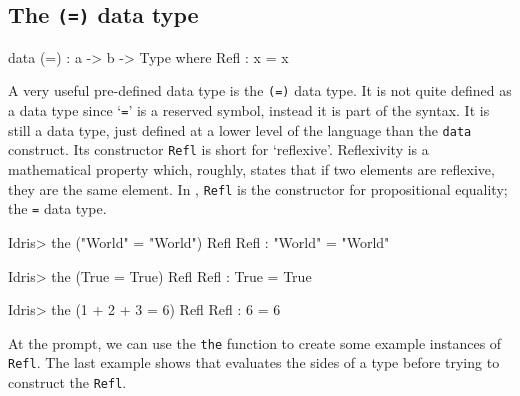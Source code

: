     \subsection{The \texttt{(=)} data type}
        \begin{code}[label={des:refl-concept}, caption={The concept of an equality data type}]
        data (=) : a -> b -> Type where
            Refl : x = x
        \end{code}
    
        A very useful pre-defined data type is the \texttt{(=)} data type. It is not quite defined as a data type since `\texttt{=}' is a reserved symbol, instead it is part of the \Idris syntax. It is still a data type, just defined at a lower level of the language than the \texttt{data} construct. Its constructor \texttt{Refl} is short for `reflexive'. Reflexivity is a mathematical property which, roughly, states that if two elements are reflexive, they are the same element. In \Idris, \texttt{Refl} is the constructor for propositional equality; the \texttt{=} data type.
    
        \begin{code}[label={des:refl-egs}, caption={Examples of reflexivity}]
        Idris> the ("World" = "World") Refl
        Refl : "World" = "World"
        
        
        Idris> the (True = True) Refl
        Refl : True = True
        
        
        Idris> the (1 + 2 + 3 = 6) Refl
        Refl : 6 = 6
        \end{code}
        At the \Idris prompt, we can use the \texttt{the} function to create some example instances of \texttt{Refl}. The last example shows that \Idris evaluates the sides of a type before trying to construct the \texttt{Refl}.
    
        \newpage
    
